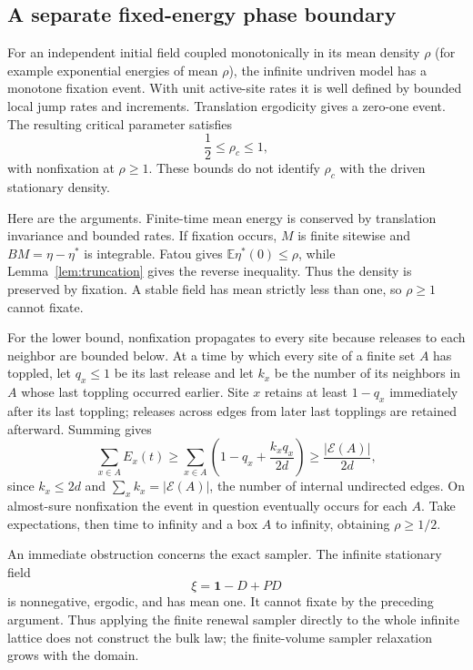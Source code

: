 \documentclass[11pt]{article}
\numberwithin{equation}{section}
\theoremstyle{definition}
\newcommand{\E}{\mathbb E}
\newcommand{\ind}{\mathbf 1}
\begin{document}
\subsection{A separate fixed-energy phase boundary}
For an independent initial field coupled monotonically in its mean density $\rho$ (for example exponential energies of mean $\rho$), the infinite undriven model has a monotone fixation event. With unit active-site rates it is well defined by bounded local jump rates and increments. Translation ergodicity gives a zero-one event. The resulting critical parameter satisfies
\begin{equation}\label{eq:fixed-energy-window}
 \frac12\le\rho_c\le1,
\end{equation}
with nonfixation at $\rho\ge1$. These bounds do not identify $\rho_c$ with the driven stationary density.

Here are the arguments. Finite-time mean energy is conserved by translation invariance and bounded rates. If fixation occurs, $M$ is finite sitewise and $BM=\eta-\eta^*$ is integrable. Fatou gives $\E\eta^*(0)\le\rho$, while Lemma~\ref{lem:truncation} gives the reverse inequality. Thus the density is preserved by fixation. A stable field has mean strictly less than one, so $\rho\ge1$ cannot fixate.

For the lower bound, nonfixation propagates to every site because releases to each neighbor are bounded below. At a time by which every site of a finite set $A$ has toppled, let $q_x\le1$ be its last release and let $k_x$ be the number of its neighbors in $A$ whose last toppling occurred earlier. Site $x$ retains at least $1-q_x$ immediately after its last toppling; releases across edges from later last topplings are retained afterward. Summing gives
\[
 \sum_{x\in A}E_x(t)
 \ge\sum_{x\in A}\left(1-q_x+\frac{k_xq_x}{2d}\right)
 \ge\frac{|\mathcal E(A)|}{2d},
\]
since $k_x\le2d$ and $\sum_xk_x=|\mathcal E(A)|$, the number of internal undirected edges. On almost-sure nonfixation the event in question eventually occurs for each $A$. Take expectations, then time to infinity and a box $A$ to infinity, obtaining $\rho\ge1/2$.

An immediate obstruction concerns the exact sampler. The infinite stationary field
\[
 \xi=\ind-D+PD
\]
is nonnegative, ergodic, and has mean one. It cannot fixate by the preceding argument. Thus applying the finite renewal sampler directly to the whole infinite lattice does not construct the bulk law; the finite-volume sampler relaxation grows with the domain.
\end{document}
